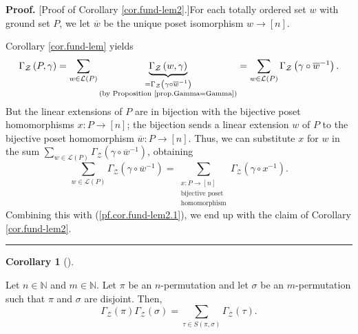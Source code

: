 \documentclass[numbers=enddot,12pt,final,onecolumn,notitlepage]{scrartcl}%
\theoremstyle{definition}
\newtheorem{coro}[theo]{Corollary}
\newenvironment{corollary}[1][]
{\begin{coro}[#1]\begin{leftbar}}
{\end{leftbar}\end{coro}}
\newenvironment{proof}[1][Proof]{\noindent\textbf{#1.} }{\ \rule{0.5em}{0.5em}}
\let\sumnonlimits\sum
\renewcommand{\sum}{\sumnonlimits\limits}
\begin{document}
\begin{proof}
[Proof of Corollary \ref{cor.fund-lem2}.]For each totally ordered set $w$ with
ground set $P$, we let $\overline{w}$ be the unique poset isomorphism
$w\rightarrow\left[  n\right]  $.

Corollary \ref{cor.fund-lem} yields%
\begin{equation}
\Gamma_{\mathcal{Z}}\left(  P,\gamma\right)  =\sum_{w\in\mathcal{L}\left(
P\right)  }\underbrace{\Gamma_{\mathcal{Z}}\left(  w,\gamma\right)
}_{\substack{=\Gamma_{\mathcal{Z}}\left(  \gamma\circ\overline{w}^{-1}\right)
\\\text{(by Proposition \ref{prop.Gamma=Gamma})}}}=\sum_{w\in\mathcal{L}%
\left(  P\right)  }\Gamma_{\mathcal{Z}}\left(  \gamma\circ\overline{w}%
^{-1}\right)  . \label{pf.cor.fund-lem2.1}%
\end{equation}
But the linear extensions of $P$ are in bijection with the bijective poset
homomorphisms $x:P\rightarrow\left[  n\right]  $; the bijection sends a linear
extension $w$ of $P$ to the bijective poset homomorphism $\overline
{w}:P\rightarrow\left[  n\right]  $. Thus, we can substitute $x$ for $w$ in
the sum $\sum_{w\in\mathcal{L}\left(  P\right)  }\Gamma_{\mathcal{Z}}\left(
\gamma\circ\overline{w}^{-1}\right)  $, obtaining%
\[
\sum_{w\in\mathcal{L}\left(  P\right)  }\Gamma_{\mathcal{Z}}\left(
\gamma\circ\overline{w}^{-1}\right)  =\sum_{\substack{x:P\rightarrow\left[
n\right]  \\\text{bijective poset}\\\text{homomorphism}}}\Gamma_{\mathcal{Z}%
}\left(  \gamma\circ x^{-1}\right)  .
\]
Combining this with (\ref{pf.cor.fund-lem2.1}), we end up with the claim of
Corollary \ref{cor.fund-lem2}.
\end{proof}

\begin{corollary}
\label{cor.prod2}Let $n\in\mathbb{N}$ and $m\in\mathbb{N}$. Let $\pi$ be an
$n$-permutation and let $\sigma$ be an $m$-permutation such that $\pi$ and
$\sigma$ are disjoint. Then,%
\[
\Gamma_{\mathcal{Z}}\left(  \pi\right)  \Gamma_{\mathcal{Z}}\left(
\sigma\right)  =\sum_{\tau\in S\left(  \pi,\sigma\right)  }\Gamma
_{\mathcal{Z}}\left(  \tau\right)  .
\]

\end{corollary}
\end{document}
